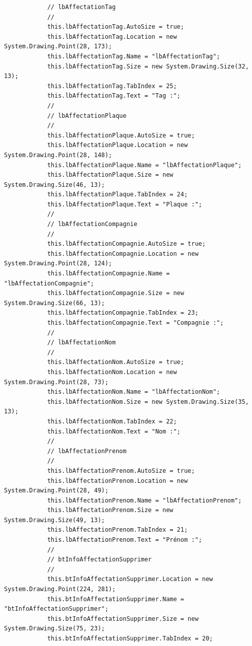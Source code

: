 \documentclass[main.tex]{subfiles}
\begin{document}
\begin{lstlisting}
            // lbAffectationTag
            // 
            this.lbAffectationTag.AutoSize = true;
            this.lbAffectationTag.Location = new System.Drawing.Point(28, 173);
            this.lbAffectationTag.Name = "lbAffectationTag";
            this.lbAffectationTag.Size = new System.Drawing.Size(32, 13);
            this.lbAffectationTag.TabIndex = 25;
            this.lbAffectationTag.Text = "Tag :";
            // 
            // lbAffectationPlaque
            // 
            this.lbAffectationPlaque.AutoSize = true;
            this.lbAffectationPlaque.Location = new System.Drawing.Point(28, 148);
            this.lbAffectationPlaque.Name = "lbAffectationPlaque";
            this.lbAffectationPlaque.Size = new System.Drawing.Size(46, 13);
            this.lbAffectationPlaque.TabIndex = 24;
            this.lbAffectationPlaque.Text = "Plaque :";
            // 
            // lbAffectationCompagnie
            // 
            this.lbAffectationCompagnie.AutoSize = true;
            this.lbAffectationCompagnie.Location = new System.Drawing.Point(28, 124);
            this.lbAffectationCompagnie.Name = "lbAffectationCompagnie";
            this.lbAffectationCompagnie.Size = new System.Drawing.Size(66, 13);
            this.lbAffectationCompagnie.TabIndex = 23;
            this.lbAffectationCompagnie.Text = "Compagnie :";
            // 
            // lbAffectationNom
            // 
            this.lbAffectationNom.AutoSize = true;
            this.lbAffectationNom.Location = new System.Drawing.Point(28, 73);
            this.lbAffectationNom.Name = "lbAffectationNom";
            this.lbAffectationNom.Size = new System.Drawing.Size(35, 13);
            this.lbAffectationNom.TabIndex = 22;
            this.lbAffectationNom.Text = "Nom :";
            // 
            // lbAffectationPrenom
            // 
            this.lbAffectationPrenom.AutoSize = true;
            this.lbAffectationPrenom.Location = new System.Drawing.Point(28, 49);
            this.lbAffectationPrenom.Name = "lbAffectationPrenom";
            this.lbAffectationPrenom.Size = new System.Drawing.Size(49, 13);
            this.lbAffectationPrenom.TabIndex = 21;
            this.lbAffectationPrenom.Text = "Prénom :";
            // 
            // btInfoAffectationSupprimer
            // 
            this.btInfoAffectationSupprimer.Location = new System.Drawing.Point(224, 281);
            this.btInfoAffectationSupprimer.Name = "btInfoAffectationSupprimer";
            this.btInfoAffectationSupprimer.Size = new System.Drawing.Size(75, 23);
            this.btInfoAffectationSupprimer.TabIndex = 20;

\end{lstlisting}
\end{document}
